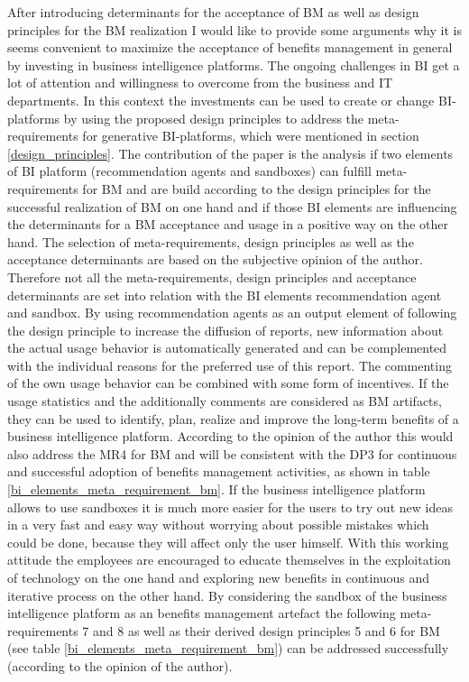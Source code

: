 After introducing determinants for the acceptance of BM as well as design principles for the BM realization I would like to provide some arguments why it is seems convenient to maximize the acceptance of benefits management in general by investing in business intelligence platforms. The ongoing challenges in BI get a lot of attention and willingness to overcome from the business \citep{gartner_threetrends_bi} and IT \citep{gartner_cio_investments} departments. In this context the investments can be used to create or change BI-platforms by using the proposed design principles to address the meta-requirements for generative BI-platforms, which were mentioned in section \ref{design_principles}. 
\newline\newline
The contribution of the paper is the analysis if two elements of BI platform (recommendation agents and sandboxes) can fulfill meta-requirements for BM and are build according to the design principles for the successful realization of BM on one hand and if those BI elements are influencing the determinants for a BM acceptance and usage in a positive way on the other hand. The selection of meta-requirements, design principles as well as the acceptance determinants are based on the subjective opinion of the author. Therefore not all the meta-requirements, design principles and acceptance determinants are set into relation with the BI elements recommendation agent and sandbox.
\newline\newline
By using recommendation agents as an output element of following the design principle to increase the diffusion of reports, new information about the actual usage behavior is automatically generated and can be complemented with the individual reasons for the preferred use of this report. The commenting of the own usage behavior can be combined with some form of incentives. If the usage statistics and the additionally comments are considered as BM artifacts, they can be used to identify, plan, realize and improve the long-term benefits of a business intelligence platform. According to the opinion of the author this would also address the MR4 for BM and will be consistent with the DP3 for continuous and successful adoption of benefits management activities, as shown in table \ref{bi_elements_meta_requirement_bm}.
\newline\newline
If the business intelligence platform allows to use sandboxes it is much more easier for the users to try out new ideas in a very fast and easy way without worrying about possible mistakes which could be done, because they will affect only the user himself. With this working attitude the employees are encouraged to educate themselves in the exploitation of technology on the one hand and exploring new benefits in continuous and iterative process on the other hand. By considering the sandbox of the business intelligence platform as an benefits management artefact the following meta-requirements 7 and 8 as well as their derived design principles 5 and 6 for BM (see table \ref{bi_elements_meta_requirement_bm}) can be addressed successfully (according to the opinion of the author).


